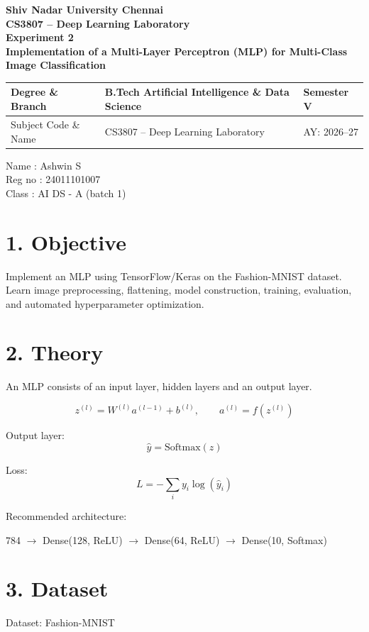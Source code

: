 \documentclass[11pt]{article}
\begin{document}
\begin{center}
{\Large\textbf{Shiv Nadar University Chennai}}\\
\textbf{CS3807 -- Deep Learning Laboratory}\\
\textbf{Experiment 2}\\
{\large\textbf{Implementation of a Multi-Layer Perceptron (MLP) for Multi-Class Image Classification}}
\end{center}

\renewcommand{\arraystretch}{1.25}

\begin{tabular}{|p{3.8cm}|p{8cm}|p{2cm}|}
\hline
Degree \& Branch & B.Tech Artificial Intelligence \& Data Science & Semester V\\ \hline
Subject Code \& Name & CS3807 -- Deep Learning Laboratory & AY: 2026--27\\ \hline
\end{tabular}

Name : Ashwin S\\
Reg no : 24011101007\\
Class : AI DS - A (batch 1)\\

\section*{1. Objective}
Implement an MLP using TensorFlow/Keras on the Fashion-MNIST dataset. Learn image preprocessing, flattening, model construction, training, evaluation, and automated hyperparameter optimization.

\section*{2. Theory}
An MLP consists of an input layer, hidden layers and an output layer.

\[
z^{(l)}=W^{(l)}a^{(l-1)}+b^{(l)},\qquad
a^{(l)}=f(z^{(l)})
\]

Output layer:
\[
\hat y=\mathrm{Softmax}(z)
\]

Loss:
\[
L=-\sum_i y_i\log(\hat y_i)
\]

Recommended architecture:

\begin{center}
784 $\rightarrow$ Dense(128, ReLU) $\rightarrow$ Dense(64, ReLU) $\rightarrow$ Dense(10, Softmax)
\end{center}

\section*{3. Dataset}
Dataset: Fashion-MNIST
\end{document}
